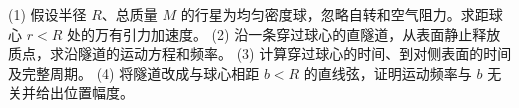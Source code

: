 (1) 假设半径 \(R\)、总质量 \(M\) 的行星为均匀密度球，忽略自转和空气阻力。求距球心 \(r<R\) 处的万有引力加速度。
(2) 沿一条穿过球心的直隧道，从表面静止释放质点，求沿隧道的运动方程和频率。
(3) 计算穿过球心的时间、到对侧表面的时间及完整周期。
(4) 将隧道改成与球心相距 \(b<R\) 的直线弦，证明运动频率与 \(b\) 无关并给出位置幅度。
